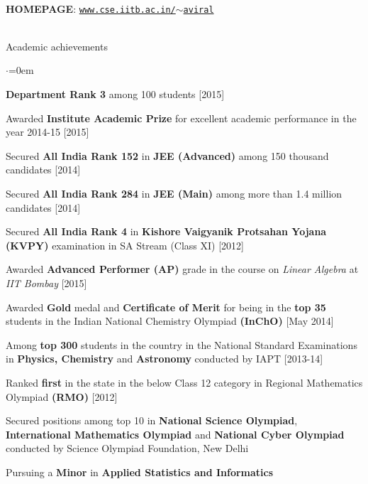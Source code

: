 \documentclass[a4paper,8pt]{resume}%
\begin{document}
\\[8\baselineskip]
\begin{center}
\textbf{HOMEPAGE}: \href{www.cse.iitb.ac.in/~aviral/index.html}{\texttt{www.cse.iitb.ac.in/$\mathtt{\sim}$aviral}}\\
\\
\end{center}
\begin{rSection}{Academic achievements}
\begin{list}{$\cdot$}{\leftmargin=0em}
{
\item \textbf{Department Rank 3} among 100 students \hfill [2015]
\item Awarded \textbf {Institute Academic Prize} for excellent academic performance in the year 2014-15 \hfill [2015]
\item Secured \textbf {All India Rank 152} in \textbf {JEE (Advanced)} among 150 thousand candidates \hfill [2014]
\item Secured \textbf {All India Rank 284} in \textbf {JEE (Main)} among more than 1.4 million candidates \hfill [2014]
\item Secured \textbf {All India Rank 4} in \textbf {Kishore Vaigyanik Protsahan Yojana (KVPY)} examination in SA Stream (Class XI)  \hfill [2012]
\item Awarded \textbf {Advanced Performer (AP)} grade in the course on \textit {Linear Algebra} at \textit {IIT Bombay} \hfill [2015]
\item Awarded \textbf {Gold} medal and \textbf{Certificate of Merit} for being in the \textbf {top 35} students in the Indian National Chemistry Olympiad \textbf {(InChO)} \hfill \hfill [May 2014]
\item Among \textbf {top 300} students in the country in the National Standard Examinations in \textbf{Physics, Chemistry} and \textbf{Astronomy} conducted by IAPT   \hfill [2013-14]
\item Ranked \textbf {first} in the state in the below Class 12 category in Regional Mathematics Olympiad \textbf {(RMO)}  \hfill \hfill [2012]
\item Secured positions among top 10 in \textbf{National Science Olympiad}, \textbf{International Mathematics Olympiad} and \textbf{National Cyber Olympiad} conducted by Science Olympiad Foundation, New Delhi
\item Pursuing a \textbf{Minor} in \textbf{Applied Statistics and Informatics} 
}
\end{list}
\end{rSection}
\end{document}
